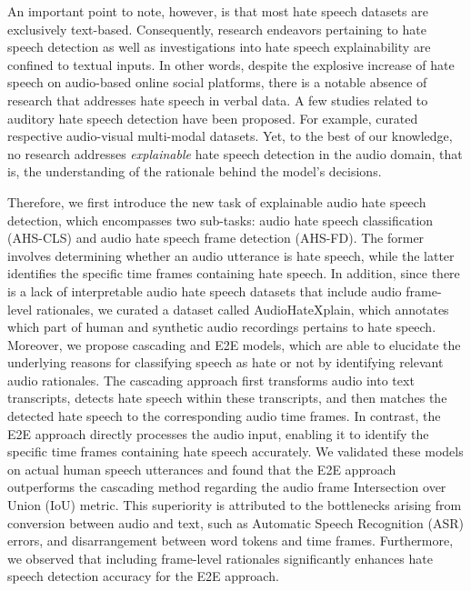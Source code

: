 \documentclass[11pt]{article}
\begin{document}
An important point to note, however, is that most hate speech datasets are exclusively text-based. Consequently, research endeavors pertaining to hate speech detection \cite{Qian-text, Park-text} as well as investigations into hate speech explainability \cite{HateXplain} are confined to textual inputs. In other words, despite the explosive increase of hate speech on audio-based online social platforms, there is a notable absence of research that addresses hate speech in verbal data. A few studies related to auditory hate speech detection have been proposed. For example, \citet{Audio1, Audio2-emotion} curated respective audio-visual multi-modal datasets. Yet, to the best of our knowledge, no research addresses \textit{explainable} hate speech detection in the audio domain, that is, the understanding of the rationale behind the model's decisions.

Therefore, we first introduce the new task of explainable audio hate speech detection, which encompasses two sub-tasks: audio hate speech classification (AHS-CLS) and audio hate speech frame detection (AHS-FD). The former involves determining whether an audio utterance is hate speech, while the latter identifies the specific time frames containing hate speech. In addition, since there is a lack of interpretable audio hate speech datasets that include audio frame-level rationales, we curated a dataset called AudioHateXplain, which annotates which part of human and synthetic audio recordings pertains to hate speech. Moreover, we propose cascading and E2E models, which are able to elucidate the underlying reasons for classifying speech as hate or not by identifying relevant audio rationales. The cascading approach first transforms audio into text transcripts, detects hate speech within these transcripts, and then matches the detected hate speech to the corresponding audio time frames. In contrast, the E2E approach directly processes the audio input, enabling it to identify the specific time frames containing hate speech accurately. We validated these models on actual human speech utterances and found that the E2E approach outperforms the cascading method regarding the audio frame Intersection over Union (IoU) metric. This superiority is attributed to the bottlenecks arising from conversion between audio and text, such as Automatic Speech Recognition (ASR) errors, and disarrangement between word tokens and time frames. Furthermore, we observed that including frame-level rationales significantly enhances hate speech detection accuracy for the E2E approach.
\end{document}
